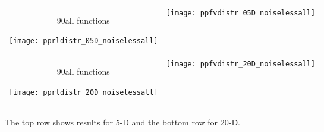 \documentclass{article}
\newcommand{\rot}[2][2.5]{
  \hspace*{-3.5\baselineskip}%
  \begin{rotate}{90}\hspace{#1em}#2
  \end{rotate}}
\begin{document}
\begin{figure}[htbp!]
\centering
\begin{tabular}{@{}c@{}c@{}}
\rot[5]{all functions}\texttt{[image: pprldistr\_05D\_noiselessall]} &
\texttt{[image: ppfvdistr\_05D\_noiselessall]}\\
\rot[5]{all functions}\texttt{[image: pprldistr\_20D\_noiselessall]} &
\texttt{[image: ppfvdistr\_20D\_noiselessall]}
\end{tabular}
\caption{\label{fig:RLDs05Da\algfolder} \bbobpprldistrlegend{} The top row shows results for 5-D and the bottom row for 20-D.}
\end{figure}
\end{document}
